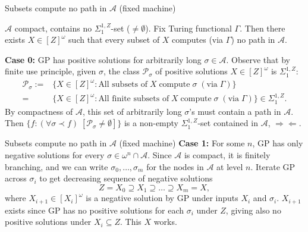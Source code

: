 \begin{frame}{Subsets compute no path in $\mathcal{A}$ (fixed
machine)}
  \begin{lemma}
    $\mathcal{A}$ compact, contains no $\Sigma_1^{1,Z}$-set
    ($\neq\emptyset$). Fix Turing functional $\Gamma$. Then there exists
    $X\in[Z]^\omega$ such that every subset of $X$ computes (via $\Gamma$)
    no path in $\mathcal{A}$.


  \end{lemma}

  \vspace{0.5em}
  \textbf{Case 0:} GP has positive solutions for arbitrarily long
  $\sigma\in\mathcal{A}$. Observe that by finite use
  principle, given $\sigma$, the class $\mathcal{P}_{\sigma}$ of positive
  solutions $X\in[Z]^\omega$ is $\Sigma_1^{1,Z}$:
  \begin{align*}
    \mathcal{P}_{\sigma}:= &\{X\in[Z]^\omega: \text{All subsets of}\; X\;
      \text{compute}\; \sigma\; (\text{via}\; \Gamma)\}\\
    =&\{X\in[Z]^\omega: \text{All finite subsets of}\; X\;
      \text{compute}\; \sigma\; (\text{via}\; \Gamma)\}
      \in\Sigma_1^{1,Z}.
  \end{align*}
  By compactness of $\mathcal{A}$, this set of arbitrarily long $\sigma$'s
  must contain a path in $\mathcal{A}$. Then $\{f:(\forall \sigma\prec f)\;
  [\mathcal{P}_\sigma \neq \emptyset]\}$ is a non-empty
  $\Sigma_1^{1,Z}$-set contained in $\mathcal{A}$, $\Rightarrow\Leftarrow$.
\end{frame}

\begin{frame}{Subsets compute no path in $\mathcal{A}$ (fixed
machine)}
  \textbf{Case 1:} For some $n$, GP has only negative solutions for every
  $\sigma\in\omega^n\cap\mathcal{A}$. Since $\mathcal{A}$ is compact, it is
  finitely branching, and we can write $\sigma_0,\ldots,\sigma_m$ for the
  nodes in $\mathcal{A}$ at level $n$.  Iterate GP across $\sigma_i$ to get
  decreasing sequence of negative solutions
  \[Z=X_0 \supseteq X_1 \supseteq \ldots\supseteq X_m=X,\]
  where $X_{i+1}\in[X_i]^\omega$ is a negative solution by GP under
  inputs $X_i$ and $\sigma_i$. $X_{i+1}$ exists since GP has no positive
  solutions for each $\sigma_i$ under $Z$, giving also no
  positive solutions under $X_i\subseteq Z$. This $X$ works.
\end{frame}

